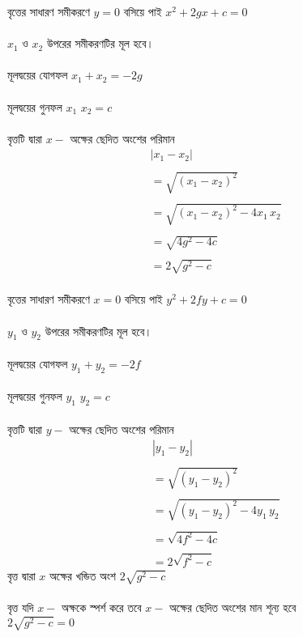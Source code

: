 \documentclass{article}
\begin{document}
বৃত্তের সাধারণ সমীকরণে $y=0$ বসিয়ে পাই $x^2+2gx+c=0$\\
\\
$x_1$ ও $x_2$ উপরের সমীকরণটির মূল হবে। \\
\\
মূলদ্বয়ের যোগফল $x_1+x_2=-2g$\\
\\
মূলদ্বয়ের গুনফল $x_1\,\,x_2=c$\\
\\
বৃত্তটি দ্বারা $x-$ অক্ষের ছেদিত অংশের পরিমান \\ 
\begin{align*}
&|x_1-x_2|\\
\\
&=\sqrt{(x_1-x_2)^2}\\
\\
&=\sqrt{(x_1-x_2)^2-4x_1\,x_2}\\
\\
&=\sqrt{4g^2-4c}\\
\\
&=2\sqrt{g^2-c}	
\end{align*} 
\\
বৃত্তের সাধারণ সমীকরণে $x=0$ বসিয়ে পাই $y^2+2fy+c=0$\\
\\
$y_1$ ও $y_2$ উপরের সমীকরণটির মূল হবে। \\
\\
মূলদ্বয়ের যোগফল $y_1+y_2=-2f$\\
\\
মূলদ্বয়ের গুনফল $y_1\,\,y_2=c$\\
\\
বৃত্তটি দ্বারা $y-$ অক্ষের ছেদিত অংশের পরিমান \\ 
\begin{align*}
	&|y_1-y_2|\\
	\\
	&=\sqrt{(y_1-y_2)^2}\\
	\\
	&=\sqrt{(y_1-y_2)^2-4y_1\,y_2}\\
	\\
	&=\sqrt{4f^2-4c}\\
	\\
	&=2\sqrt{f^2-c}	
\end{align*} 
বৃত্ত দ্বারা $x$ অক্ষের খন্ডিত অংশ	$2\sqrt{g^2-c}$\\
\\
বৃত্ত যদি $x-$ অক্ষকে স্পর্শ করে তবে $x-$ অক্ষের ছেদিত অংশের মান শূন্য হবে  \\
$2\sqrt{g^2-c}=0$\\
\end{document}
